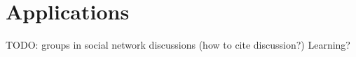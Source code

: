 \chapter{Applications}\label{chapter:applications}

TODO: groups in social network discussions (how to cite discussion?)
Learning?
